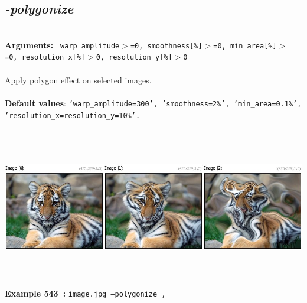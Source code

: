 \documentclass[a4paper,11pt,twoside]{book}
\begin{document}
\subsection{\emph{-polygonize} }\vspace*{-0.5em}
~\\\textbf{Arguments: } 
{\small \texttt{\_warp\_amplitude$>$=0,\_smoothness[\%]$>$=0,\_min\_area[\%]$>$=0,\_resolution\_x[\%]$>$0,\_resolution\_y[\%]$>$0}}\\~\\
Apply polygon effect on selected images.
~\\~\\\textbf{Default values}: {\small \texttt{'warp\_amplitude=300', 'smoothness=2\%', 'min\_area=0.1\%', 'resolution\_x=resolution\_y=10\%'.}}
\begin{center}\includegraphics[keepaspectratio=true,height=7cm,width=\textwidth]{img/gmic_def543.jpg}\\
{\footnotesize \textbf{Example 543~:} \texttt{image.jpg --polygonize ,}}
\end{center}
\end{document}
